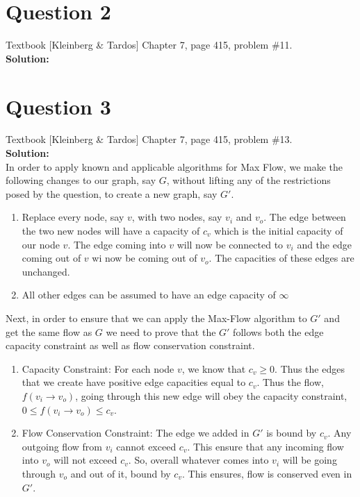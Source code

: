 \documentclass[11pt]{article}
\begin{document}
\clearpage
\section{Question 2} Textbook [Kleinberg \& Tardos] Chapter 7, page 415, problem \#11. \\
\textbf{Solution:} \\


\clearpage
\section{Question 3} Textbook [Kleinberg \& Tardos] Chapter 7, page 415, problem \#13. \\
\textbf{Solution:} \\

In order to apply known and applicable algorithms for Max Flow, we make the following changes to our graph, say $ G $, without lifting any of the restrictions posed by the question, to create a new graph, say $ G' $.
\begin{enumerate}
	\item Replace every node, say $ v $, with two nodes, say $ v_i $ and $ v_o $. The edge between the two new nodes will have a capacity of $ c_v $ which is the initial capacity of our node $ v $. The edge coming into $ v $ will now be connected to $ v_i $ and the edge coming out of $ v $ wi now be coming out of $ v_o $. The capacities of these edges are unchanged.
	\item All other edges can be assumed to have an edge capacity of $ \infty $
\end{enumerate}

Next, in order to ensure that we can apply the Max-Flow algorithm to $ G' $ and get the same flow as $ G $ we need to prove that the $ G' $ follows both the edge capacity constraint as well as flow conservation constraint.

\begin{enumerate}
	\item Capacity Constraint: For each node $ v $, we know that $ c_v \ge 0 $. Thus the edges that we create have positive edge capacities equal to $ c_v $. Thus the flow, $ f(v_i \to v_o) $, going through this new edge will obey the capacity constraint, $ 0 \le f(v_i \to v_o) \le c_v $.
	\item Flow Conservation Constraint: The edge we added in $ G' $ is bound by $ c_v $. Any outgoing flow from $ v_i $ cannot exceed $ c_v $. This ensure that any incoming flow into $ v_o $ will not exceed $ c_v $. So, overall whatever comes into $ v_i $ will be going through $ v_o $ and out of it, bound by $ c_v $. This ensures, flow is conserved even in $ G' $.
\end{enumerate}
\end{document}
